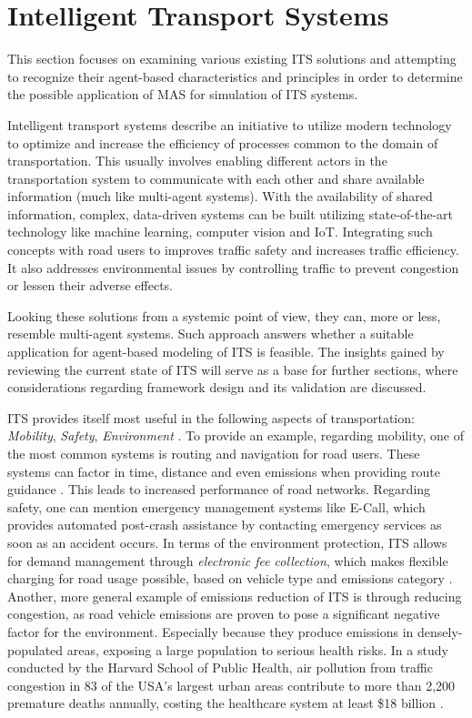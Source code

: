 \documentclass[0main.tex]{subfiles}
\begin{document}
\section{Intelligent Transport Systems}\label{sec-its}

This section focuses on examining various existing ITS solutions and attempting to recognize their
agent-based characteristics and principles in order to determine the possible application of MAS for
simulation of ITS systems.

Intelligent transport systems describe an initiative to utilize modern technology 
to optimize and increase the efficiency of processes common to the domain of transportation. 
This usually involves enabling different actors in the transportation system to communicate 
with each other and share available information (much like multi-agent systems). With the 
availability of shared information, complex, data-driven systems can be built utilizing 
state-of-the-art technology like machine learning, computer vision and IoT. Integrating 
such concepts with road users to improves traffic safety and increases traffic efficiency.
It also addresses environmental issues by controlling traffic to prevent congestion or lessen
their adverse effects. 

Looking these solutions from a systemic point of view, they can, more or less, resemble
multi-agent systems. Such approach answers whether a suitable application for agent-based
modeling of ITS is feasible. The insights gained by reviewing the current state of ITS will
serve as a base for further sections, where considerations regarding framework design and
its validation are discussed. 

ITS provides itself most useful in the following aspects of transportation: \emph{Mobility},
\emph{Safety}, \emph{Environment} \cite{Lishchenko2021}. To provide an example, regarding
mobility, one of the most common systems is routing and navigation for road users. These
systems can factor in time, distance and even emissions when providing route guidance
\cite{Firmin2006}. This leads to increased performance of road networks. Regarding safety, one
can mention emergency management systems like E-Call, which provides automated post-crash
assistance by contacting emergency services as soon as an accident occurs. In terms of the
environment protection, ITS allows for demand management through \emph{electronic fee
collection}, which makes flexible charging for road usage possible, based on vehicle type and
emissions category \cite{Commision2022}. Another, more general example of emissions reduction
of ITS is through reducing congestion, as road vehicle emissions are proven to pose a significant
negative factor for the environment. Especially because they produce emissions in
densely-populated areas, exposing a large population to serious health risks. In a study
conducted by the Harvard School of Public Health, air pollution from traffic congestion in 83
of the USA's largest urban areas contribute to more than 2,200 premature deaths annually,
costing the healthcare system at least \$18 billion \cite{Levy2011}.
\end{document}
